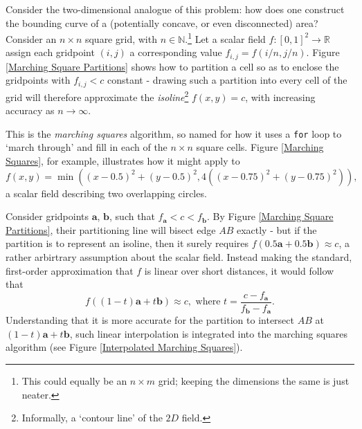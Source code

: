 \documentclass[a4paper, 11pt]{article}
\begin{document}
\begin{flushleft}
Consider the two-dimensional analogue of this problem: how does one construct the bounding curve of a (potentially concave, or even disconnected) area? Consider an $n \times n$ square grid, with $n \in \mathbb{N}$.\footnote{This could equally be an $n \times m$ grid; keeping the dimensions the same is just neater.} Let a scalar field $f : [0,1]^2 \rightarrow \mathbb{R}$ assign each gridpoint $(i,j)$ a corresponding value $f_{i,j} = f(i/n,j/n)$. Figure \ref{Marching Square Partitions} shows how to partition a cell so as to enclose the gridpoints with $f_{i,j} < c$ constant - drawing such a partition into every cell of the grid will therefore approximate the \textit{isoline}\footnote{Informally, a `contour line' of the $2D$ field.} $f(x,y) = c$, with increasing accuracy as $n \rightarrow \infty$.%



\vspace{5pt}\noindent
This is the \textit{marching squares} algorithm, so named for how it uses a \texttt{for} loop to `march through' and fill in each of the $n \times n$ square cells. Figure \ref{Marching Squares}, for example, illustrates how it might apply to 
$$f(x,y) = \min\left(\left(x-0.5\right)^2+\left(y-0.5\right)^2,4\left(\left(x-0.75\right)^2+\left(y-0.75\right)^2\right)\right),$$
a scalar field describing two overlapping circles.


\vspace{5pt}\noindent
Consider gridpoints $\mathbf{a}$, $\mathbf{b}$, such that $f_{\mathbf{a}} < c < f_{\mathbf{b}}$. By Figure \ref{Marching Square Partitions}, their partitioning line will bisect edge $AB$ exactly - but if the partition is to represent an isoline, then it surely requires $f\left(0.5\mathbf{a} + 0.5\mathbf{b}\right) \approx c$, a rather arbirtrary assumption about the scalar field. Instead making the standard, first-order approximation that $f$ is linear over short distances, it would follow that
$$f\left((1-t)\mathbf{a} + t\mathbf{b}\right) \approx c, \,\, \textrm{where} \,\, t = \frac{c-f_{\mathbf{a}}}{f_{\mathbf{b}}-f_{\mathbf{a}}}.$$
Understanding that it is more accurate for the partition to intersect $AB$ at $(1-t)\mathbf{a} + t\mathbf{b}$, such linear interpolation is integrated into the marching squares algorithm (see Figure \ref{Interpolated Marching Squares}).


\end{flushleft}
\end{document}
